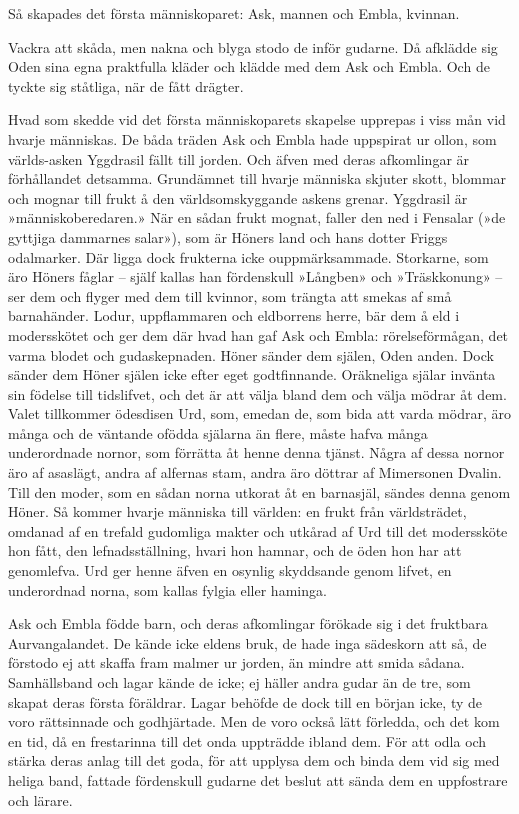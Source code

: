 Så skapades det första människoparet: Ask, mannen och Embla, kvinnan.

Vackra att skåda, men nakna och blyga stodo de inför gudarne. Då
afklädde sig Oden sina egna praktfulla kläder och klädde med dem Ask och
Embla. Och de tyckte sig ståtliga, när de fått drägter.

Hvad som skedde vid det första människoparets skapelse upprepas i viss
mån vid hvarje människas. De båda träden Ask och Embla hade uppspirat ur
ollon, som världs-asken Yggdrasil fällt till jorden. Och äfven med deras
afkomlingar är förhållandet detsamma. Grundämnet till hvarje människa
skjuter skott, blommar och mognar till frukt å den världsomskyggande
askens grenar. Yggdrasil är »människoberedaren.» När en sådan frukt
mognat, faller den ned i Fensalar (»de gyttjiga dammarnes salar»), som
är Höners land och hans dotter Friggs odalmarker. Där ligga dock
frukterna icke ouppmärksammade. Storkarne, som äro Höners fåglar --
själf kallas han fördenskull »Långben» och »Träskkonung» -- ser dem och
flyger med dem till kvinnor, som trängta att smekas af små barnahänder.
Lodur, uppflammaren och eldborrens herre, bär dem å eld i modersskötet
och ger dem där hvad han gaf Ask och Embla: rörelseförmågan, det varma
blodet och gudaskepnaden. Höner sänder dem själen, Oden anden. Dock
sänder dem Höner själen icke efter eget godtfinnande. Oräkneliga själar
invänta sin födelse till tidslifvet, och det är att välja bland dem och
välja mödrar åt dem. Valet tillkommer ödesdisen Urd, som, emedan de, som
bida att varda mödrar, äro många och de väntande ofödda själarna än
flere, måste hafva många underordnade nornor, som förrätta åt henne
denna tjänst. Några af dessa nornor äro af asaslägt, andra af alfernas
stam, andra äro döttrar af Mimersonen Dvalin. Till den moder, som en
sådan norna utkorat åt en barnasjäl, sändes denna genom Höner. Så kommer
hvarje människa till världen: en frukt från världsträdet, omdanad af en
trefald gudomliga makter och utkårad af Urd till det moderssköte hon
fått, den lefnadsställning,
hvari hon hamnar, och de öden hon har att genomlefva. Urd ger henne
äfven en osynlig skyddsande genom lifvet, en underordnad norna, som
kallas fylgia eller haminga.

Ask och Embla födde barn, och deras afkomlingar förökade sig i det
fruktbara Aurvangalandet. De kände icke eldens bruk, de hade inga
sädeskorn att så, de förstodo ej att skaffa fram malmer ur jorden, än
mindre att smida sådana. Samhällsband och lagar kände de icke; ej häller
andra gudar än de tre, som skapat deras första föräldrar. Lagar behöfde
de dock till en början icke, ty de voro rättsinnade och godhjärtade. Men
de voro också lätt förledda, och det kom en tid, då en frestarinna till
det onda uppträdde ibland dem. För att odla och stärka deras anlag till
det goda, för att upplysa dem och binda dem vid sig med heliga band,
fattade fördenskull gudarne det beslut att sända dem en uppfostrare och
lärare.

